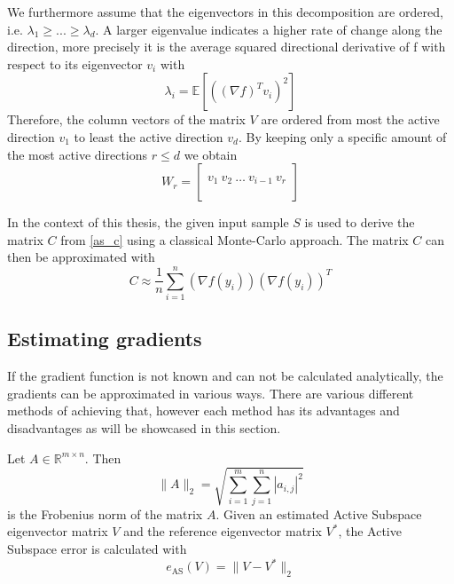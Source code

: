 \documentclass[
  a4paper,  %
  twoside,  %
  bibliography=totoc,
  headsepline,
  cleardoublepage=empty,
  parskip=half,
  draft=false
]{scrbook}
\begin{document}
We furthermore assume that the eigenvectors in this decomposition are ordered, i.e. $\lambda_1 \geq ... \geq \lambda_d$.
A larger eigenvalue indicates a higher rate of change along the direction, more precisely it is the average squared directional derivative of f with respect to its eigenvector $v_i$ \cite{CG14} with
\begin{equation}
\lambda_i=\mathds{E}[((\nabla f)^T v_i)^2]
\label{eigenvalues}
\end{equation}
Therefore, the column vectors of the matrix $V$ are ordered from most the active direction $v_1$ to least the active direction $v_d$.
By keeping only a specific amount of the most active directions $r \leq d$ we obtain
\begin{equation}
W_r=\begin{bmatrix}
  \\
    v_1 ~ v_2 ~ \dots ~ v_{i-1} ~ v_r\\
    \\
  \end{bmatrix}
\label{basis}
\end{equation}

In the context of this thesis, the given input sample $S$ is used to derive the matrix $C$ from \ref{as_c} using a classical Monte-Carlo approach.
The matrix $C$ can then be approximated with
\begin{equation}
C \approx \frac{1}{n} \sum_{i=1}^n  (\nabla f(y_i)) (\nabla f(y_i))^T
\nonumber
\end{equation}




\subsection{Estimating gradients}

If the gradient function is not known and can not be calculated analytically, the gradients can be approximated in various ways.
There are various different methods of achieving that, however each method has its advantages and disadvantages as will be showcased in this section.

\begin{definition}
Let $A \in \mathds{R}^{m \times n}$. Then
\begin{equation}
\| A\|_2=\sqrt{\sum_{i=1}^m \sum_{j=1}^n |a_{i,j}|^2}
\nonumber
\end{equation}
is the Frobenius norm of the matrix $A$.
Given an estimated Active Subspace eigenvector matrix $V$ and the reference eigenvector matrix $V^*$, the
Active Subspace error is calculated with
\begin{equation}
e_{\text{AS}}(V)=\| V - V^* \|_2
\nonumber
\end{equation}
\end{definition}
\end{document}
